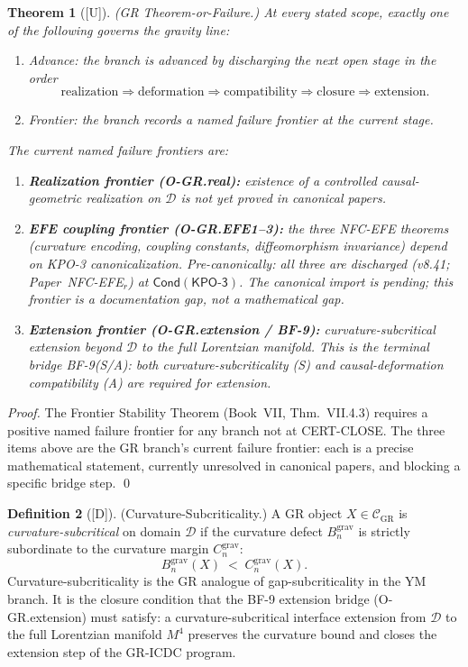 \documentclass[12pt,oneside]{amsbook}
\theoremstyle{plain}
\newtheorem{theorem}{Theorem}[section]
\theoremstyle{definition}
\newtheorem{definition}[theorem]{Definition}
\theoremstyle{remark}
\newcommand{\status}[1]{\textup{[#1]}}
\begin{document}
\begin{theorem}[\status{U}]\label{thm:gr-frontier}
\textup{(GR Theorem-or-Failure.)} At every stated scope, exactly
one of the following governs the gravity line:
\begin{enumerate}[label=\textup{(\alph*)}]
 \item \emph{Advance:} the branch is advanced by discharging
 the next open stage in the order
 \[
 \text{realization}
 \Rightarrow \text{deformation}
 \Rightarrow \text{compatibility}
 \Rightarrow \text{closure}
 \Rightarrow \text{extension}.
 \]
 \item \emph{Frontier:} the branch records a named failure
 frontier at the current stage.
\end{enumerate}
The current named failure frontiers are:
\begin{enumerate}[label=\textup{(\roman*)}]
 \item \textbf{Realization frontier (O-GR.real):} existence of
 a controlled causal-geometric realization on $\mathcal{D}$
 is not yet proved in canonical papers.
 \item \textbf{EFE coupling frontier (O-GR.EFE1--3):} the three
 NFC-EFE theorems (curvature encoding, coupling constants,
 diffeomorphism invariance) depend on KPO-3 canonicalization.
 Pre-canonically: all three are discharged
 (v8.41; Paper~NFC-EFE$_r$) at
 $\mathsf{Cond}(\mathsf{KPO\text{-}3})$.
 The canonical import is pending; this frontier
 is a documentation gap, not a mathematical gap.
 \item \textbf{Extension frontier (O-GR.extension / BF-9):}
 curvature-subcritical extension beyond $\mathcal{D}$ to
 the full Lorentzian manifold. This is the terminal bridge
 BF-9(S/A): both curvature-subcriticality
 \textup{(S)} and causal-deformation compatibility
 \textup{(A)} are required for extension.
\end{enumerate}
\end{theorem}

\begin{proof}
The Frontier Stability Theorem (Book~VII, Thm.~VII.4.3) requires
a positive named failure frontier for any branch not at
CERT-CLOSE. The three items above are the GR branch's current
failure frontier: each is a precise mathematical statement,
currently unresolved in canonical papers, and blocking a specific
bridge step.
\qed
\end{proof}

\begin{definition}[\status{D}]\label{def:GR-curvature-subcritical}
\textup{(Curvature-Subcriticality.)}
A GR object $X \in \mathcal{C}_{\mathrm{GR}}$ is
\emph{curvature-subcritical} on domain $\mathcal{D}$ if the
curvature defect $B_n^{\mathrm{grav}}$ is strictly subordinate to
the curvature margin $C_n^{\mathrm{grav}}$:
\[
 B_n^{\mathrm{grav}}(X) \;<\; C_n^{\mathrm{grav}}(X).
\]
Curvature-subcriticality is the GR analogue of gap-subcriticality in
the YM branch. It is the closure condition that the BF-9 extension
bridge (O-GR.extension) must satisfy: a curvature-subcritical
interface extension from $\mathcal{D}$ to the full Lorentzian manifold
$M^4$ preserves the curvature bound and closes the extension step of
the GR-ICDC program.
\end{definition}
\end{document}
